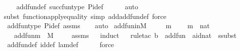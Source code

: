 \begin{isabellebody}
\ \ \isamarkupfalse%
\ add{\isacharunderscore}{\kern0pt}fun{\isacharunderscore}{\kern0pt}def\ succ{\isacharunderscore}{\kern0pt}fun{\isacharunderscore}{\kern0pt}type\ Pi{\isacharunderscore}{\kern0pt}def\isanewline
\ \ \ \ \isamarkupfalse%
\ auto{\isacharbrackleft}{\kern0pt}{}{\isacharbrackright}{\kern0pt}\isanewline
\ \ \isamarkupfalse%
{\isacharparenleft}{\kern0pt}subst\ function{\isacharunderscore}{\kern0pt}apply{\isacharunderscore}{\kern0pt}equality{\isacharcomma}{\kern0pt}\ simp\ add{\isacharcolon}{\kern0pt}add{\isacharunderscore}{\kern0pt}fun{\isacharunderscore}{\kern0pt}def{\isacharcomma}{\kern0pt}\ force{\isacharparenright}{\kern0pt}\isanewline
\ \ \isamarkupfalse%
\ add{\isacharunderscore}{\kern0pt}fun{\isacharunderscore}{\kern0pt}type\ Pi{\isacharunderscore}{\kern0pt}def\ assms\isanewline
\ \ \isamarkupfalse%
\ auto%
\endisatagproof
{\isafoldproof}%
%
\isadelimproof
\isanewline
%
\endisadelimproof
\isanewline
{}\isamarkupfalse%
\ add{\isacharunderscore}{\kern0pt}fun{\isacharunderscore}{\kern0pt}in{\isacharunderscore}{\kern0pt}M\ {\isacharcolon}{\kern0pt}\ \isanewline
\ \ \ m\ \isanewline
\ \ \ {\isachardoublequoteopen}m\ {\isasymin}\ nat{\isachardoublequoteclose}\ \isanewline
\ \ \ {\isachardoublequoteopen}add{\isacharunderscore}{\kern0pt}fun{\isacharparenleft}{\kern0pt}m{\isacharparenright}{\kern0pt}\ {\isasymin}\ M{\isachardoublequoteclose}\ \isanewline
%
\isadelimproof
\ \ %
\endisadelimproof
%
\isatagproof
{}\isamarkupfalse%
\ assms\isanewline
\ \ \isamarkupfalse%
{\isacharparenleft}{\kern0pt}induct{\isacharparenright}{\kern0pt}\isanewline
\ \ \isamarkupfalse%
{\isacharparenleft}{\kern0pt}rule{\isacharunderscore}{\kern0pt}tac\ b\ {\isacharequal}{\kern0pt}\ {\isachardoublequoteopen}add{\isacharunderscore}{\kern0pt}fun{\isacharparenleft}{\kern0pt}{}{\isacharparenright}{\kern0pt}{\isachardoublequoteclose}\ \ a{\isacharequal}{\kern0pt}{\isachardoublequoteopen}id{\isacharparenleft}{\kern0pt}nat{\isacharparenright}{\kern0pt}{\isachardoublequoteclose}\ \ ssubst{\isacharparenright}{\kern0pt}\isanewline
\ \ \isamarkupfalse%
\ add{\isacharunderscore}{\kern0pt}fun{\isacharunderscore}{\kern0pt}def\ id{\isacharunderscore}{\kern0pt}def\ lam{\isacharunderscore}{\kern0pt}def\isanewline
\ \ \ \ \isamarkupfalse%
\ force\ \isanewline
\ \ \isamarkupfalse%

\end{isabellebody}
